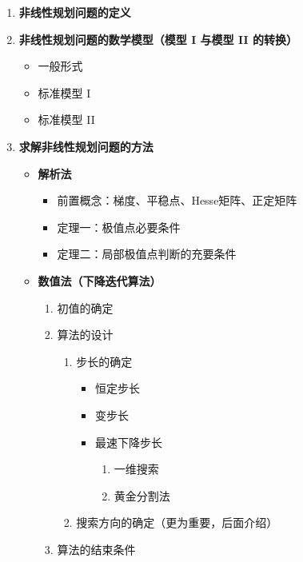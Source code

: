 \begin{enumerate}
    \item \textbf{非线性规划问题的定义}
    
    \item \textbf{非线性规划问题的数学模型（模型 I 与模型 II 的转换）}
    \begin{itemize}
        \item 一般形式
        \item 标准模型 I
        \item 标准模型 II
    \end{itemize}
    
    \item \textbf{求解非线性规划问题的方法}
    \begin{itemize}
        \item \textbf{解析法}
        \begin{itemize}
            \item 前置概念：梯度、平稳点、Hesse矩阵、正定矩阵
            \item 定理一：极值点必要条件
            \item 定理二：局部极值点判断的充要条件
        \end{itemize}
        
        \item \textbf{数值法（下降迭代算法）}
        \begin{enumerate}
            \item 初值的确定
            \item 算法的设计
            \begin{enumerate}
                \item 步长的确定
                \begin{itemize}
                    \item 恒定步长
                    \item 变步长
                    \item 最速下降步长
                    \begin{enumerate}
                        \item 一维搜索
                        \item 黄金分割法
                    \end{enumerate}
                \end{itemize}
                \item 搜索方向的确定（更为重要，后面介绍）
            \end{enumerate}
            \item 算法的结束条件
        \end{enumerate}
    \end{itemize}
\end{enumerate}


